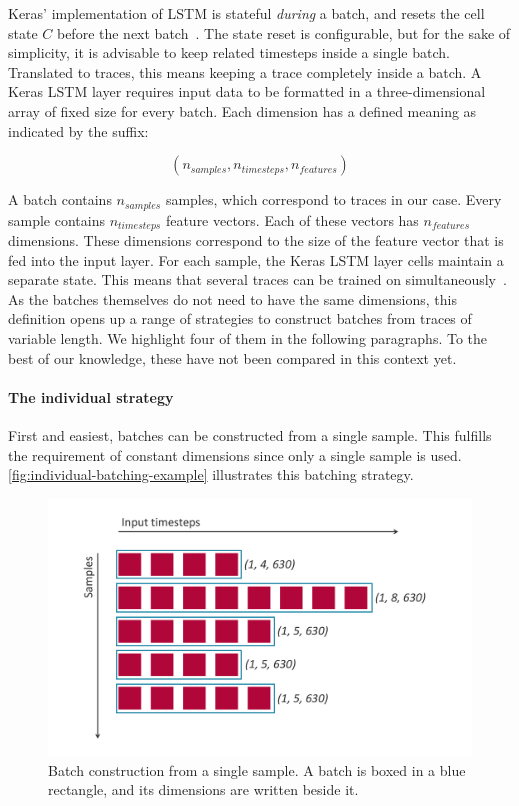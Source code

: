 Keras' implementation of LSTM is stateful \textit{during} a batch, and resets the cell state $C$ before the next batch~\cite{web:keras}.
The state reset is configurable, but for the sake of simplicity, it is advisable to keep related timesteps inside a single batch.
Translated to traces, this means keeping a trace completely inside a batch.
A Keras LSTM layer requires input data to be formatted in a three-dimensional array of fixed size for every batch.
Each dimension has a defined meaning as indicated by the suffix:

$$(n_{samples}, n_{timesteps}, n_{features})$$

A batch contains $n_{samples}$ samples, which correspond to traces in our case.
Every sample contains $n_{timesteps}$ feature vectors.
Each of these vectors has $n_{features}$ dimensions.
These dimensions correspond to the size of the feature vector that is fed into the input layer.
For each sample, the Keras LSTM layer cells maintain a separate state.
This means that several traces can be trained on simultaneously~\cite{web:keras-lstm-state}.
As the batches themselves do not need to have the same dimensions, this definition opens up a range of strategies to construct batches from traces of variable length.
We highlight four of them in the following paragraphs.
To the best of our knowledge, these have not been compared in this context yet.\\

\paragraph{The individual strategy}
First and easiest, batches can be constructed from a single sample.
This fulfills the requirement of constant dimensions since only a single sample is used.
\autoref{fig:individual-batching-example} illustrates this batching strategy.

\begin{figure}[!htb]
    \centering
    \includegraphics[width=\textwidth]{gfx/individual-batching.pdf}
    \caption[Individual strategy for batches]{Batch construction from a single sample. A batch is boxed in a blue rectangle, and its dimensions are written beside it.}
    \label{fig:individual-batching-example}
\end{figure}

